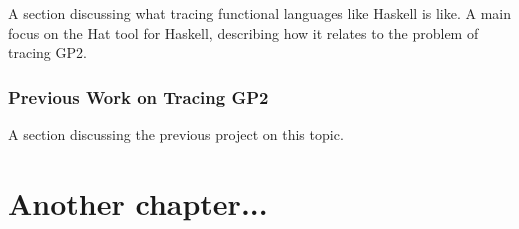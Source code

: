 \documentclass[authoryearcitations]{UoYCSproject}
\begin{document}
A section discussing what tracing functional languages like Haskell is like. A
main focus on the Hat tool for Haskell, describing how it relates to the
problem of tracing GP2.


\subsection{Previous Work on Tracing GP2}
\label{sec:PreviousWorkOnTracingGP2}

A section discussing the previous project \citep{taylor2016} on this topic.



\clearpage

\chapter{Another chapter...}



\clearpage


\end{document}
